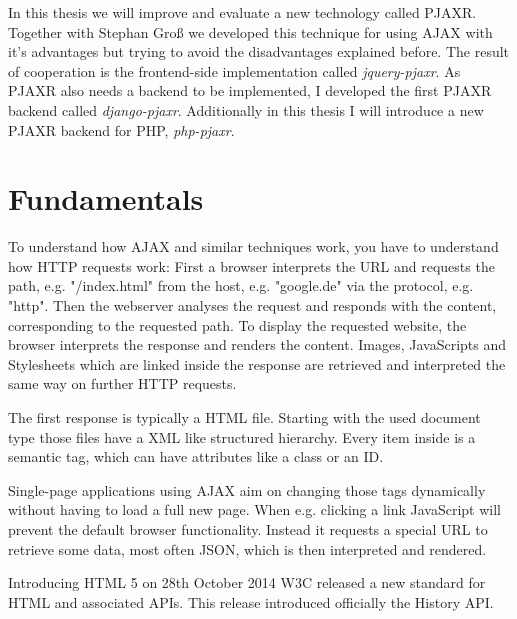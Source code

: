 \documentclass[f,bachelor,binding,twoside,palatino]{WeSTthesis}
\def \ajax {AJAX}
\def \pjaxr {PJAXR}
\def \jqueryPjaxr {jquery-pjaxr}
\def \djangoPjaxr {django-pjaxr}
\def \phpPjaxr {php-pjaxr}
\def \httpRequest {HTTP request}
\def \SinglePageApplication {Single-page application}
\begin{document}
  In this thesis we will improve and evaluate a new technology called \pjaxr{}. 
  Together with Stephan Gro{\ss} we developed this technique for using \ajax{} with it's advantages but trying to avoid the disadvantages explained before.
  The result of cooperation is the frontend-side implementation called \emph{\jqueryPjaxr{}}.
  As \pjaxr{} also needs a backend to be implemented, I developed the first \pjaxr{} backend called \emph{\djangoPjaxr{}}.
  Additionally in this thesis I will introduce a new \pjaxr{} backend for PHP, \emph{\phpPjaxr{}}.
  
  
\section{Fundamentals}
  To understand how \ajax{} and similar techniques work, you have to understand how \httpRequest{}s work:
  First a browser interprets the URL and requests the path, e.g. "/index.html" from the host, e.g. "google.de" via the protocol, e.g. "http".
  Then the webserver analyses the request and responds with the content, corresponding to the requested path.
  To display the requested website, the browser interprets the response and renders the content. 
  Images, JavaScripts and Stylesheets which are linked inside the response are retrieved and interpreted the same way on further \httpRequest{}s.

  The first response is typically a HTML file.
  Starting with the used document type those files have a XML like structured hierarchy.
  Every item inside is a semantic tag, which can have attributes like a class or an ID.

  \SinglePageApplication{}s using \ajax{} aim on changing those tags dynamically without having to load a full new page.
  When e.g. clicking a link JavaScript will prevent the default browser functionality. Instead it requests a special URL to retrieve some data, most often JSON, which is then interpreted and rendered.

  Introducing HTML 5 on 28th October 2014 W3C released a new standard for HTML and associated APIs. 
  This release introduced officially the History API.
\end{document}
